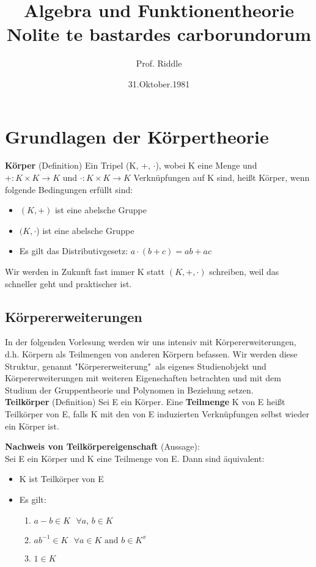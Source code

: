 \documentclass[a4paper, 10pt]{scrartcl}
\title {Algebra und Funktionentheorie \\[1ex] \large Nolite te bastardes carborundorum}
\author{Prof. Riddle}
\date{31.Oktober.1981}
\begin{document}
\maketitle
\tableofcontents
\section{Grundlagen der Körpertheorie}
\textbf{Körper} (Definition)
Ein Tripel (K, +, $\cdot$), wobei K eine Menge und $+: K \times K \rightarrow K $ und $\cdot: K \times K \rightarrow K$ Verknüpfungen auf K sind, heißt Körper, wenn folgende Bedingungen erfüllt sind:
\begin{itemize}
\item $(K,+)$ ist eine abelsche Gruppe
\item $(K, \cdot$) ist eine abelsche Gruppe
\item Es gilt das Distributivgesetz: $a \cdot (b+c) = ab + ac$
\end{itemize}
Wir werden in Zukunft fast immer K statt $(K, +, \cdot)$ schreiben, weil das schneller geht und praktischer ist.
\\

\subsection{Körpererweiterungen}
In der folgenden Vorlesung werden wir uns intensiv mit Körpererweiterungen, d.h. Körpern als Teilmengen von anderen Körpern befassen. Wir werden diese Struktur, genannt "Körpererweiterung"\ als eigenes Studienobjekt und Körpererweiterungen mit weiteren Eigenschaften betrachten und mit dem Studium der Gruppentheorie und Polynomen in Beziehung setzen.
\\

\textbf{Teilkörper} (Definition)
Sei E ein Körper. Eine \textbf{Teilmenge} K von E heißt Teilkörper von E, falls K mit den von E induzierten Verknüpfungen selbst wieder ein Körper ist.

\textbf{Nachweis von Teilkörpereigenschaft} (Aussage): \\
Sei E ein Körper und K eine Teilmenge von E. Dann sind äquivalent:
\begin{itemize}
\item K ist Teilkörper von E
\item Es gilt: \begin{enumerate}[label=\roman*)]
\item $a-b \in K \text{ } \forall a \text{, }b \in K$
\item $ab^{-1} \in K \text{ } \forall a \in K \text{ and } b \in K^{x}$
\item $1 \in K$
\end{enumerate}
\end{itemize}
\end{document}
